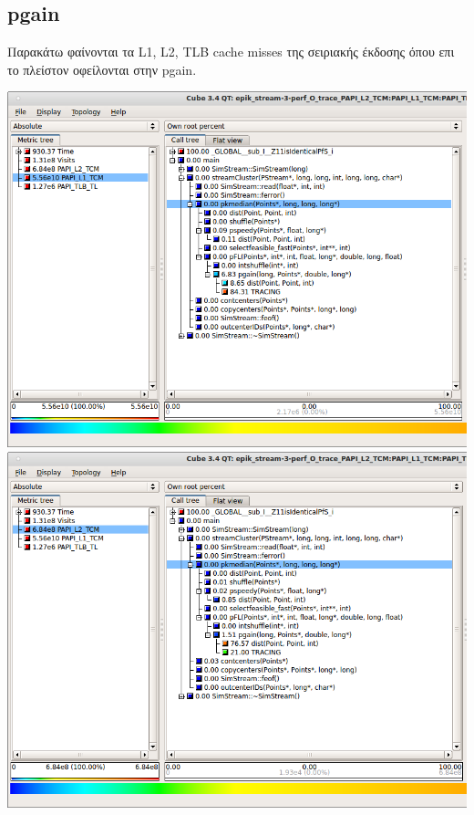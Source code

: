 \documentclass[a4paper,11pt]{article}
\begin{document}
\subsection*{pgain}
Παρακάτω φαίνονται τα L1, L2, TLB cache misses της σειριακής έκδοσης όπου επι το πλείστον οφείλονται στην pgain.
\begin{center}
\includegraphics[width=\textwidth]{../scrshots/l1.png}
\includegraphics[width=\textwidth]{../scrshots/l2.png}

\end{center}
\end{document}
